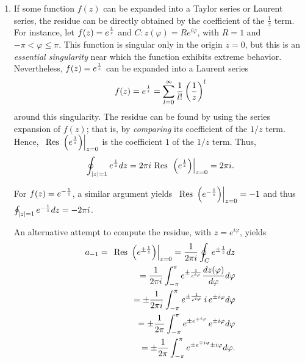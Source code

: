{\begin{enumerate}
\item
If some function $f(z)$ can be expanded into a Taylor series or Laurent series,
the residue can be directly obtained by the coefficient of the $\frac{1}{z}$ term.
For instance, let $f(z) = e^{1\over z}$ and $C: z(\varphi )=R e^{i\varphi}$, with $R=1$ and $-\pi < \varphi \le \pi$.
This function is singular only in the origin $z=0$,
but this is an {\em essential singularity} near which the function exhibits extreme behavior.
Nevertheless, $f(z) = e^{1\over z}$
can be expanded into a Laurent series
$$
f(z) = e^{1\over z} =\sum_{l=0}^\infty \frac{1}{l!}   \left(\frac{1}{z}\right)^l
$$
around this singularity.
The residue can be found  by using the series expansion of $f(z)$;
that is, by {\em comparing} its coefficient of the $1/z$ term.
Hence,  $\left.\textrm{ Res }\left( e^{1\over z} \right) \right|_{z=0}$
is the coefficient $1$ of the $1/z$ term.
Thus,
\begin{equation}
\oint_{\vert z\vert =1}
e^{1\over z} dz
=
2\pi i
\textrm{ Res }\left. \left( e^{1\over z} \right)\right|_{z=0} = 2\pi i.
\end{equation}


For $f(z) = e^{-{1\over z}}$, a similar argument yields  $\left.\textrm{ Res }\left( e^{-{1\over z}} \right) \right|_{z=0} = -1$
and thus  $
\oint_{\vert z\vert =1}
e^{-{1\over z}} dz =  -2\pi i$.

An alternative attempt to compute the residue, with $z=e^{i\varphi}$, yields
\begin{equation}
\begin{split}
a_{-1}= \left.\textrm{ Res }\left( e^{\pm {1\over z}} \right) \right|_{z=0} =
 {1\over 2\pi i}\oint_C e^{\pm{ 1\over z}}dz \\
 = {1\over 2\pi i}\int_{-\pi}^\pi  e^{\pm {1\over e^{i\varphi}}}\frac{dz(\varphi )}{d\varphi } d\varphi  \\
= \pm {1\over 2\pi i}\int_{-\pi}^\pi  e^{\pm {1\over e^{i\varphi}}}\, i\, e^{\pm i\varphi} d\varphi    \\
 = \pm {1\over 2\pi }\int_{-\pi}^\pi  e^{\pm e^{\mp i\varphi}}\,  e^{\pm i\varphi} d\varphi    \\
  = \pm {1\over 2\pi }\int_{-\pi}^\pi  e^{\pm e^{\mp i\varphi} \pm i\varphi} d\varphi    .
\end{split}
\end{equation}






\end{enumerate}
\eexample
}






